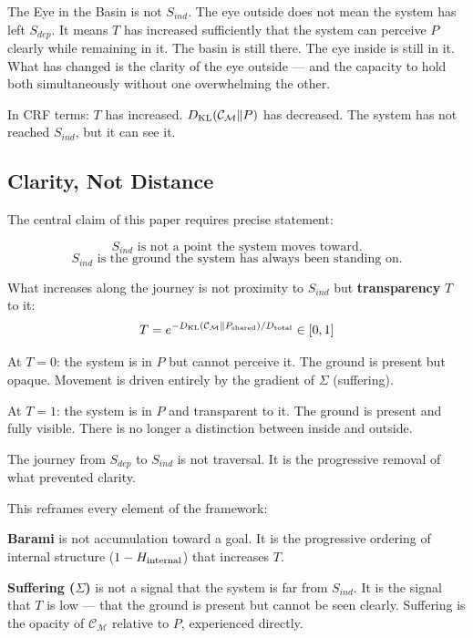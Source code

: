 \documentclass[12pt, a4paper]{article}
\begin{document}
The Eye in the Basin is not $S_{ind}$. The eye outside does not mean the system
has left $S_{dep}$. It means $T$ has increased sufficiently that the system
can perceive $P$ clearly while remaining in it. The basin is still there.
The eye inside is still in it. What has changed is the clarity of the
eye outside --- and the capacity to hold both simultaneously without
one overwhelming the other.

In CRF terms: $T$ has increased. $D_{\rm KL}(\mathcal{C}_\mathcal{M}\|P)$ has
decreased. The system has not reached $S_{ind}$, but it can see it.

\subsection*{Clarity, Not Distance}

The central claim of this paper requires precise statement:

\begin{keybox}[title={The Inversion: $S_{ind}$ is Ground, Not Destination}]
\[
  S_{ind} \text{ is not a point the system moves toward.}
\]
\[
  S_{ind} \text{ is the ground the system has always been standing on.}
\]

What increases along the journey is not proximity to $S_{ind}$ but
\textbf{transparency} $T$ to it:
\[
  T = e^{-D_{\rm KL}(\mathcal{C}_\mathcal{M}\|P_{\rm shared})/D_{\rm total}}
  \in [0, 1]
\]

At $T = 0$: the system is in $P$ but cannot perceive it. The ground is present
but opaque. Movement is driven entirely by the gradient of $\Sigma$ (suffering).

At $T = 1$: the system is in $P$ and transparent to it. The ground is present
and fully visible. There is no longer a distinction between inside and outside.

The journey from $S_{dep}$ to $S_{ind}$ is not traversal.
It is the progressive removal of what prevented clarity.
\end{keybox}

This reframes every element of the framework:

\textbf{Barami} is not accumulation toward a goal. It is the progressive
ordering of internal structure ($1 - H_{\rm internal}$) that increases $T$.

\textbf{Suffering ($\Sigma$)} is not a signal that the system is far from $S_{ind}$.
It is the signal that $T$ is low --- that the ground is present but cannot
be seen clearly. Suffering is the opacity of $\mathcal{C}_\mathcal{M}$
relative to $P$, experienced directly.
\end{document}
